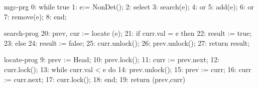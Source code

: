 %
%
\newcommand{\MGCBody}{
  \begin{algorithmic}[1]
    \While {$\true$}
    \State $e := \NondetChooseElem$
    \State $\Nondet$
    \State $\left[ \begin{array}{l}
	\Call \search(e) \\
	\ProgOr \\
	\Call \add(e) \\
	\ProgOr \\
	\Call \remove(e)
      \end{array} \right]$
    \EndWhile
  \end{algorithmic}
}

\begin{SaveVerbatim}[fontfamily=courier]{mgc-prg}
0:  while true
1:     e:= NonDet();
2:     select
3:        search(e);
4:     or
5:        add(e);
6:     or
7:        remove(e);
8:  end;
\end{SaveVerbatim}

\newcommand{\MGCPrg}{
  \begin{minipage}[c]{5.0cm}
    \MGCBody
  \end{minipage}
}
\newcommand{\MGCFig}{
  \begin{minipage}[c]{4.1cm}
    \MGCBody
    \label{fig:mgc}
  \end{minipage}
}

%
%
\begin{SaveVerbatim}{search-prog}
20:  prev, cur := locate (e);
21:  if curr.val = e then
22:      result := true;
23:  else
24:      result := false;
25:  curr.unlock();
26:  prev.unlock();
27:  return result;
\end{SaveVerbatim}

\newcommand{\SearchBody}{
  \begin{algorithmic}[1]
    \State $\prev, \curr := \locate(e)$
    \If {$\curr.\val = e$}
    \State $\result := \true$
    \Else
    \State $\result := \false$
    \EndIf
    \State $\curr.\unlock()$
    \State $\prev.\unlock()$
    \State \tbf{return} $\result$
  \end{algorithmic}
}
\newcommand{\SearchPrg}{
  \begin{minipage}[c]{3.9cm}
    \SearchBody
  \end{minipage}
}
\newcommand{\SearchFig}{
\begin{minipage}[c]{3.9cm}
  \SearchBody
\label{fig:search}
\end{minipage}
}

%
%
\begin{SaveVerbatim}{locate-prog}
 9:  prev := Head;
10:  prev.lock();
11:  curr := prev.next;
12:  curr.lock();
13:  while curr.val < e do
14:      prev.unlock();
15:      prev := curr;
16:      curr := curr.next;
17:      curr.lock();
18:  end;
19:  return (prev,curr)
\end{SaveVerbatim}

